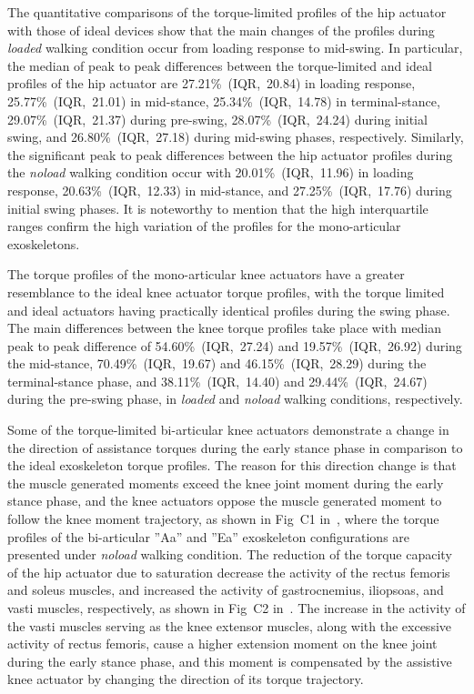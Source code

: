\documentclass[10pt,letterpaper]{article}
\begin{document}
The quantitative comparisons of the torque-limited profiles of the hip actuator with those of ideal devices show that the main changes of the profiles during \emph{loaded} walking condition occur from loading response to mid-swing. In particular, the median of peak to peak differences between the torque-limited and ideal profiles of the hip actuator are 27.21\%~(IQR,~20.84) in loading response, 25.77\%~(IQR,~21.01) in mid-stance, 25.34\%~(IQR,~14.78) in terminal-stance, 29.07\%~(IQR,~21.37) during pre-swing, 28.07\%~(IQR,~24.24) during initial swing, and 26.80\%~(IQR,~27.18) during mid-swing phases, respectively. Similarly, the significant peak to peak differences between the hip actuator profiles during the \emph{noload} walking condition occur with 20.01\%~(IQR,~11.96) in loading response,  20.63\%~(IQR,~12.33) in mid-stance, and  27.25\%~(IQR,~17.76) during initial swing phases. It is noteworthy to mention that the high interquartile ranges confirm the high variation of the profiles for the mono-articular exoskeletons.

The torque profiles of the mono-articular knee actuators have a greater resemblance to the ideal knee actuator torque profiles, with the torque limited and ideal actuators having practically identical profiles during the swing phase. The main differences between the knee torque profiles take place with median peak to peak difference of 54.60\%~(IQR,~27.24) and 19.57\%~(IQR,~26.92) during the mid-stance, 70.49\%~(IQR,~19.67) and 46.15\%~(IQR,~28.29) during the terminal-stance phase, and 38.11\%~(IQR,~14.40) and 29.44\%~(IQR,~24.67) during the pre-swing phase, in \emph{loaded} and \emph{noload} walking conditions, respectively.

Some of the torque-limited bi-articular knee actuators demonstrate a change in the direction of assistance torques during the early stance phase in comparison to the ideal exoskeleton torque profiles. The reason for this direction change is that the muscle generated moments exceed the knee joint moment during the early stance phase, and the knee actuators oppose the muscle generated moment to follow the knee moment trajectory, as shown in Fig~C1 in~, where the torque profiles of the bi-articular ''Aa'' and ''Ea'' exoskeleton configurations are presented under {\it noload} walking condition. The reduction of the torque capacity of the hip actuator due to saturation decrease the activity of the rectus femoris and soleus muscles, and increased the activity of gastrocnemius, iliopsoas, and vasti muscles, respectively, as shown in Fig~C2 in~. The increase in the activity of the vasti muscles serving as the knee extensor muscles, along with the excessive activity of rectus femoris, cause a higher extension moment on the knee joint during the early stance phase, and this moment is compensated by the assistive knee actuator by changing the direction of its torque trajectory.
\end{document}
